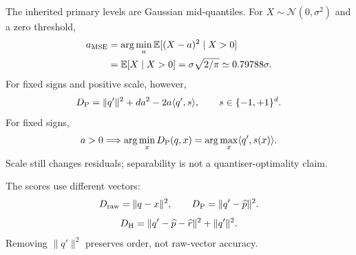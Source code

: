 The inherited primary levels are Gaussian mid-quantiles. For $X\sim\mathcal N(0,\sigma^2)$ and a zero threshold,
\[
 \begin{aligned}
 a_{\rm MSE}
 &=\arg\min_a\mathbb E[(X-a)^2\mid X>0]\\
 &=\mathbb E[X\mid X>0]
 =\sigma\sqrt{2/\pi}\simeq0.79788\sigma.
 \end{aligned}
\] For fixed signs and positive scale, however,
\begin{equation}
 D_{\mathrm{P}}=\|q'\|^2+da^2-2a\langle q',s\rangle,
 \qquad s\in\{-1,+1\}^d.
 \label{eq:2-sign-order}
\end{equation}
For fixed signs,
\[
 a>0\Longrightarrow
 \arg\min_xD_{\mathrm{P}}(q,x)
 =\arg\max_x\langle q',s(x)\rangle.
\]
Scale still changes residuals; separability is not a quantiser-optimality claim.

The scores use different vectors:
\[
 D_{\mathrm{raw}}=\|q-x\|^2,\qquad
 D_{\mathrm{P}}=\|q'-\widehat p\|^2.
\]
\begin{equation}
 D_{\mathrm{H}}=\|q'-\widehat p-\widehat r\|^2+\|q'\|^2.
 \label{eq:2-refined}
\end{equation}
Removing $\|q'\|^2$ preserves order, not raw-vector accuracy.